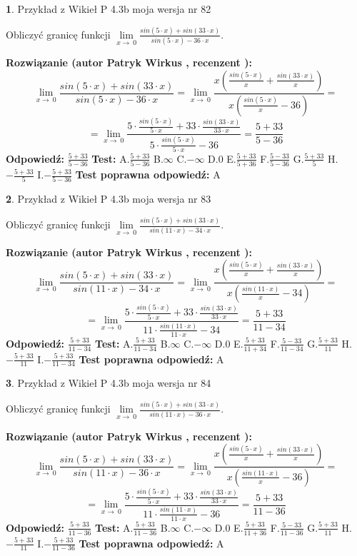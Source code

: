 \documentclass[12pt, a4paper]{article}
\theoremstyle{definition} %
\newtheorem{zad}{}
\newcommand{\zadStart}[1]{\begin{zad}#1\newline}
\newcommand{\zadStop}{\end{zad}}
\newcommand{\rozwStart}[2]{\noindent \textbf{Rozwiązanie (autor #1 , recenzent #2): }\newline}
\newcommand{\rozwStop}{\newline}
\newcommand{\odpStart}{\noindent \textbf{Odpowiedź:}\newline}
\newcommand{\odpStop}{\newline}
\newcommand{\testStart}{\noindent \textbf{Test:}\newline}
\newcommand{\testStop}{\newline}
\newcommand{\kluczStart}{\noindent \textbf{Test poprawna odpowiedź:}\newline}
\newcommand{\kluczStop}{\newline}
\begin{document}
\zadStart{Przykład z Wikieł P 4.3b moja wersja nr 82}


Obliczyć granicę funkcji $\lim\limits_{x\to\ 0}\frac{sin(5 \cdot x)+sin(33 \cdot x)}{sin(5 \cdot x)-36 \cdot x}$.
\zadStop
\rozwStart{Patryk Wirkus}{}
$$\lim\limits_{x\to\ 0}\frac{sin(5 \cdot x)+sin(33 \cdot x)}{sin(5 \cdot x)-36 \cdot x}=\lim\limits_{x\to\ 0}\frac{x(\frac{sin(5 \cdot x)}{x}+\frac{sin(33 \cdot x)}{x})}{x(\frac{sin(5 \cdot x)}{x}-36)}=$$
$$=\lim\limits_{x\to\ 0}\frac{5 \cdot \frac{sin(5 \cdot x)}{5 \cdot x}+33 \cdot \frac{sin(33 \cdot x)}{33 \cdot x}}{5 \cdot \frac{sin(5 \cdot x)}{5 \cdot x}-36}=\frac{5+33}{5-36}$$
\rozwStop
\odpStart
$\frac{5+33}{5-36}$
\odpStop
\testStart
A.$\frac{5+33}{5-36}$
B.$\infty$
C.$-\infty$
D.$0$
E.$\frac{5+33}{5+36}$
F.$\frac{5-33}{5-36}$
G.$\frac{5+33}{5}$
H.$-\frac{5+33}{5}$
I.$-\frac{5+33}{5-36}$
\testStop
\kluczStart
A
\kluczStop



\zadStart{Przykład z Wikieł P 4.3b moja wersja nr 83}


Obliczyć granicę funkcji $\lim\limits_{x\to\ 0}\frac{sin(5 \cdot x)+sin(33 \cdot x)}{sin(11 \cdot x)-34 \cdot x}$.
\zadStop
\rozwStart{Patryk Wirkus}{}
$$\lim\limits_{x\to\ 0}\frac{sin(5 \cdot x)+sin(33 \cdot x)}{sin(11 \cdot x)-34 \cdot x}=\lim\limits_{x\to\ 0}\frac{x(\frac{sin(5 \cdot x)}{x}+\frac{sin(33 \cdot x)}{x})}{x(\frac{sin(11 \cdot x)}{x}-34)}=$$
$$=\lim\limits_{x\to\ 0}\frac{5 \cdot \frac{sin(5 \cdot x)}{5 \cdot x}+33 \cdot \frac{sin(33 \cdot x)}{33 \cdot x}}{11 \cdot \frac{sin(11 \cdot x)}{11 \cdot x}-34}=\frac{5+33}{11-34}$$
\rozwStop
\odpStart
$\frac{5+33}{11-34}$
\odpStop
\testStart
A.$\frac{5+33}{11-34}$
B.$\infty$
C.$-\infty$
D.$0$
E.$\frac{5+33}{11+34}$
F.$\frac{5-33}{11-34}$
G.$\frac{5+33}{11}$
H.$-\frac{5+33}{11}$
I.$-\frac{5+33}{11-34}$
\testStop
\kluczStart
A
\kluczStop



\zadStart{Przykład z Wikieł P 4.3b moja wersja nr 84}


Obliczyć granicę funkcji $\lim\limits_{x\to\ 0}\frac{sin(5 \cdot x)+sin(33 \cdot x)}{sin(11 \cdot x)-36 \cdot x}$.
\zadStop
\rozwStart{Patryk Wirkus}{}
$$\lim\limits_{x\to\ 0}\frac{sin(5 \cdot x)+sin(33 \cdot x)}{sin(11 \cdot x)-36 \cdot x}=\lim\limits_{x\to\ 0}\frac{x(\frac{sin(5 \cdot x)}{x}+\frac{sin(33 \cdot x)}{x})}{x(\frac{sin(11 \cdot x)}{x}-36)}=$$
$$=\lim\limits_{x\to\ 0}\frac{5 \cdot \frac{sin(5 \cdot x)}{5 \cdot x}+33 \cdot \frac{sin(33 \cdot x)}{33 \cdot x}}{11 \cdot \frac{sin(11 \cdot x)}{11 \cdot x}-36}=\frac{5+33}{11-36}$$
\rozwStop
\odpStart
$\frac{5+33}{11-36}$
\odpStop
\testStart
A.$\frac{5+33}{11-36}$
B.$\infty$
C.$-\infty$
D.$0$
E.$\frac{5+33}{11+36}$
F.$\frac{5-33}{11-36}$
G.$\frac{5+33}{11}$
H.$-\frac{5+33}{11}$
I.$-\frac{5+33}{11-36}$
\testStop
\kluczStart
A
\kluczStop
\end{document}
